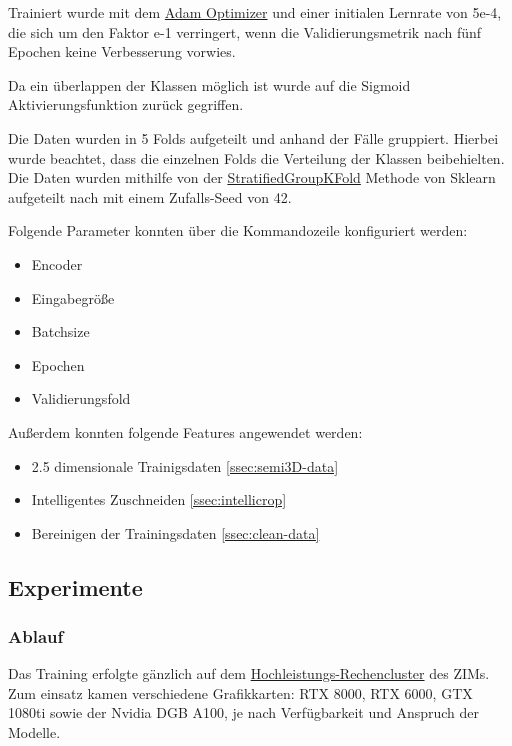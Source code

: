  Trainiert wurde mit dem
\href{https://optimization.cbe.cornell.edu/index.php?title=Adam}{Adam Optimizer}
 und einer initialen Lernrate von 5e-4, die sich um den Faktor e-1 verringert, wenn die Validierungsmetrik nach fünf Epochen keine Verbesserung vorwies.
 
 Da ein überlappen der Klassen möglich ist wurde auf die Sigmoid Aktivierungsfunktion zurück gegriffen. 

Die Daten wurden in 5 Folds aufgeteilt und anhand der Fälle gruppiert. Hierbei wurde beachtet, dass die einzelnen Folds die Verteilung der Klassen beibehielten.
Die Daten wurden mithilfe von der 
\href{https://scikit-learn.org/stable/modules/generated/sklearn.model_selection.StratifiedGroupKFold.html}{StratifiedGroupKFold} Methode von Sklearn aufgeteilt nach mit einem  Zufalls-Seed von 42.

Folgende Parameter konnten über die Kommandozeile konfiguriert werden:
\begin{itemize}
\item Encoder
\item Eingabegröße
\item Batchsize
\item Epochen
\item Validierungsfold
\end{itemize}

Außerdem konnten folgende Features angewendet werden:
\begin{itemize}
\item 2.5 dimensionale Trainigsdaten \ref{ssec:semi3D-data}
\item Intelligentes Zuschneiden \ref{ssec:intellicrop}
\item Bereinigen der Trainingsdaten \ref{ssec:clean-data}
\end{itemize}

\subsection{Experimente}

\subsubsection{Ablauf}

Das Training erfolgte gänzlich auf dem \href{https://wiki.hhu.de/display/HPC/Abschlussarbeiten+im+HPC}{Hochleistungs-Rechencluster} des ZIMs. Zum einsatz kamen verschiedene Grafikkarten: RTX 8000, RTX 6000, GTX 1080ti sowie der Nvidia DGB A100, je nach Verfügbarkeit und Anspruch der Modelle. 

